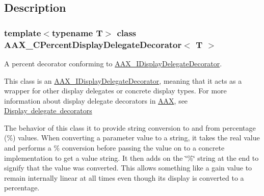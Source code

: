 \subsection{Description}
\subsubsection*{template$<$typename T$>$\newline
class A\+A\+X\+\_\+\+C\+Percent\+Display\+Delegate\+Decorator$<$ T $>$}

A percent decorator conforming to \mbox{\hyperlink{a01805}{A\+A\+X\+\_\+\+I\+Display\+Delegate\+Decorator}}. 

This class is an \mbox{\hyperlink{a01805}{A\+A\+X\+\_\+\+I\+Display\+Delegate\+Decorator}}, meaning that it acts as a wrapper for other display delegates or concrete display types. For more information about display delegate decorators in \mbox{\hyperlink{a00852}{A\+AX}}, see \mbox{\hyperlink{a00816_displaydelegates_decorators}{Display delegate decorators}}

The behavior of this class it to provide string conversion to and from percentage (\%) values. When converting a parameter value to a string, it takes the real value and performs a \% conversion before passing the value on to a concrete implementation to get a value string. It then adds on the \char`\"{}\%\char`\"{} string at the end to signify that the value was converted. This allows something like a gain value to remain internally linear at all times even though its display is converted to a percentage.

